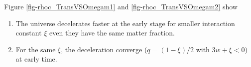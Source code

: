 \documentclass[12pt,a4paper]{article}
\begin{document}
Figure \ref{fig-rhoc_TransVSOmegam1} and \ref{fig-rhoc_TransVSOmegam2} show

\begin{enumerate}
\item
The universe decelerates faster at the early stage for smaller interaction constant $\xi$ even they have the same matter fraction.
\item
For the same $\xi$, the deceleration converge ($q=(1-\xi)/2$ with $3w+\xi < 0$) at early time.
\end{enumerate}











\end{document}
